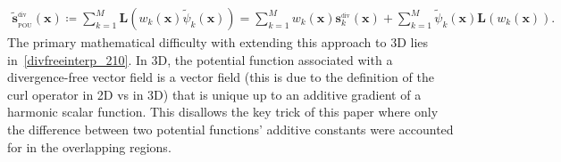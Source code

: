 \documentclass[12pt]{exam}
\def\bx{\mathbf{x}}
\def\bs{\mathbf{s}}
\def\bL{\mathbf{L}}
\begin{document}
\begin{questions}
\begin{align}
\tilde{\mathbf{s}}^{_{\text{div}}}_{_{\text{POU}}}(\bx) \coloneqq \sum\limits_{k=1}^{M} \bL \left(w_k(\bx) \tilde{\psi}_k(\bx)\right) = \sum\limits_{k=1}^{M} w_k(\bx) \bs_k^{_{\text{div}}}(\bx) + \sum\limits_{k=1}^{M} \tilde{\psi}_k(\bx) \bL(w_k(\bx)). \label{divfreelocalpou}
\end{align}
%
The primary mathematical difficulty with extending this approach to 3D lies in~\eqref{divfreeinterp_210}. In 3D, the potential function associated with a divergence-free vector field is a vector field (this is due to the definition of the curl operator in 2D vs in 3D) that is unique up to an additive gradient of a harmonic scalar function. This disallows the key trick of this paper where only the difference between two potential functions' additive constants were accounted for in the overlapping regions.


\end{questions}
\end{document}
